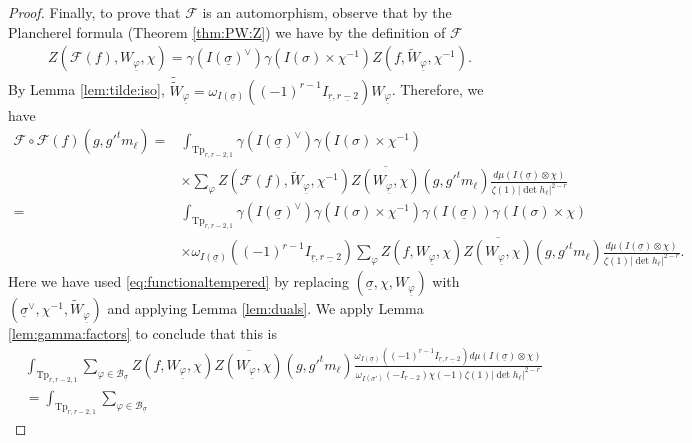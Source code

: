 \documentclass[12pt]{amsart}
\theoremstyle{remark}
\numberwithin{equation}{section}
\theoremstyle{definition}
\numberwithin{equation}{subsection}
\begin{document}
\begin{proof}
    Finally, to prove that $\mathcal{F}$ is an automorphism, observe that by the Plancherel formula (Theorem \ref{thm:PW:Z}) we have by the definition of $\mathcal{F}$
    \begin{align}\label{eq:functionaltempered}
    Z(\mathcal{F}(f),W_{\underline{\varphi}},\chi)=\gamma( I(\underline{\sigma})^\vee )\gamma(
    I(\sigma) \times \chi^{-1})Z(f,\widetilde{W}_{\underline{\varphi}},\chi^{-1}).
\end{align}
By Lemma \ref{lem:tilde:iso}, $\widetilde{\widetilde{W}}_{\underline{\varphi}}=\omega_{I(\underline{\sigma})}((-1)^{r-1}I_{\underline{r},\underline{r-2}})W_{\underline{\varphi}}$.
Therefore, we have
    \begin{align*}
        \mathcal{F} \circ \mathcal{F}(f)(g,g'^tm_{\ell})=&\int_{\mathrm{Tp}_{r,r-2,1}}\gamma( I(\underline{\sigma})^\vee)\gamma(I(\sigma) \times \chi^{-1})\\& \times 
      \sum_{\varphi}
    Z(\mathcal{F}(f),\widetilde{W}_{\underline{\varphi}},\chi^{-1})\overline{Z(W_{\underline{\varphi}},\chi)}(g,g'^tm_{\ell})\frac{d\mu(I(\underline{\sigma}) \otimes \chi)}{\zeta(1)|\det h_\ell|^{2-r}}\\
    =&\int_{\mathrm{Tp}_{r,r-2,1}}\gamma( I(\underline{\sigma})^\vee)\gamma(
    I(\sigma) \times \chi^{-1})\gamma(I(\underline{\sigma}))\gamma(
    I(\sigma) \times \chi)\\& \times 
    \omega_{I(\underline{\sigma})}((-1)^{r-1}I_{\underline{r},\underline{r-2}})\sum_{\varphi}
    Z(f,W_{\underline{\varphi}},\chi)\overline{Z(W_{\underline{\varphi}},\chi)}(g,g'^tm_{\ell})\frac{d\mu(I(\underline{\sigma}) \otimes \chi)}{\zeta(1)|\det h_\ell|^{2-r}}. 
    \end{align*}
    Here we have used \eqref{eq:functionaltempered} by replacing $(\underline{\sigma},\chi,W_{\underline{\varphi}})$ with $(\underline{\sigma}^\lor,\chi^{-1},\widetilde{W}_{\underline{\varphi}})$ and applying Lemma \ref{lem:duals}.
    We apply Lemma \ref{lem:gamma:factors} to conclude that this is
    \begin{align*}
       &\int_{\mathrm{Tp}_{r,r-2,1}}
      \sum_{\varphi \in \mathcal{B}_{\underline{\sigma}}}
    Z(f,W_{\underline{\varphi}},\chi)\overline{Z(W_{\underline{\varphi}},\chi)}(g,g'^tm_{\ell})\frac{\omega_{I(\underline{\sigma})}((-1)^{r-1}I_{\underline{r},\underline{r-2}})d\mu(I(\underline{\sigma}) \otimes \chi)}{\omega_{I(\sigma')}(-I_{r-2})\chi(-1)\zeta(1)|\det h_\ell|^{2-r}}\\
    &=\int_{\mathrm{Tp}_{r,r-2,1}} \sum_{\varphi \in \mathcal{B}_{\underline{\sigma}}}

\end{align*}
\end{proof}
\end{document}
